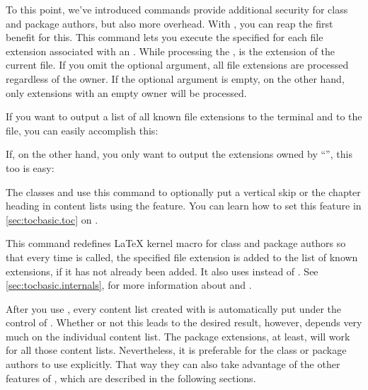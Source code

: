 \begin{Declaration}
\end{Declaration}
To this point, we've introduced commands provide additional security for class
and package authors, but also more overhead. With ,
you can reap the first benefit for this. This command lets you execute the
specified  for each file extension associated with an
. While processing the ,  is the
extension of the current file. If you omit the optional 
argument, all file extensions are processed regardless of the owner. If the
optional argument is empty, on the other hand, only extensions with an empty
owner will be processed.
\begin{Example}
  If you want to output a list of all known file extensions to the terminal
  and to the  file, you can easily accomplish this:
\begin{lstcode}
  \doforeachtocfile{\typeout{\@currext}}
\end{lstcode}
  If, on the other hand, you only want to output the extensions owned by
  ``'', this too is easy:
\begin{lstcode}
  \doforeachtocfile[foo]{\typeout{\@currext}}
\end{lstcode}
\end{Example}
The \KOMAScript{} classes  and  use this
command to optionally put a vertical skip or the chapter heading in content
lists using the  feature. You can learn how to set this
feature in \autoref{sec:tocbasic.toc} on
.%
\EndIndexGroup


\begin{Declaration}
\end{Declaration}
This command redefines \LaTeX{} kernel macro  for class and
package authors so that every time  is called, the specified
file extension is added to the list of known extensions, if it has not already
been added. It also uses  instead of
. See \autoref{sec:tocbasic.internals},
 for more information about
 and .

After you use , every content list created with
 is automatically put under the control of
. Whether or not this leads to the desired result, however,
depends very much on the individual content list. The  package
extensions, at least, will work for all those content lists. Nevertheless, it
is preferable for the class or package authors to use 
explicitly. That way they can also take advantage of the other features of
, which are described in the following sections.%
\EndIndexGroup


